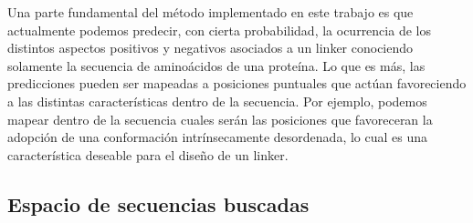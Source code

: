 
Una parte fundamental del método implementado en este trabajo es que actualmente podemos predecir, con cierta probabilidad, 
la ocurrencia de los distintos aspectos positivos y negativos asociados a un linker conociendo solamente la secuencia de aminoácidos de una proteína.
Lo que es más, las predicciones pueden ser mapeadas a posiciones puntuales que actúan favoreciendo a las distintas características dentro de la secuencia. 
Por ejemplo, podemos mapear dentro de la secuencia cuales serán las posiciones 
que favoreceran la adopción de una conformación intrínsecamente desordenada, lo cual es una característica deseable para el diseño de un linker.







\subsection{Espacio de secuencias buscadas}\label{espacioSecuencial}


